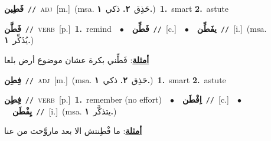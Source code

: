 \documentclass[10pt,a4paper,twoside]{article} %
\begin{document}
\begin{multicols}{2}
{\setlength\topsep{0pt}\textbf{\foreignlanguage{arabic}{فَطِين}}\ {\color{gray}\texttt{//}\color{black}}\ \textsc{adj}\ [m.]\ \color{gray}(msa. \foreignlanguage{arabic}{حَذِق}~\foreignlanguage{arabic}{\textbf{٢.}}  \foreignlanguage{arabic}{ذكي}~\foreignlanguage{arabic}{\textbf{١.}})\color{black}\ \textbf{1.}~smart  \textbf{2.}~astute\ } \vspace{2mm}

{\setlength\topsep{0pt}\textbf{\foreignlanguage{arabic}{فَطَّن}}\ {\color{gray}\texttt{//}\color{black}}\ \textsc{verb}\ [p.]\ \textbf{1.}~remind\ \ $\bullet$\ \ \setlength\topsep{0pt}\textbf{\foreignlanguage{arabic}{فَطِّن}}\ {\color{gray}\texttt{//}\color{black}}\ [c.]\ \ $\bullet$\ \ \setlength\topsep{0pt}\textbf{\foreignlanguage{arabic}{يفَطِّن}}\ {\color{gray}\texttt{//}\color{black}}\ [i.]\ \color{gray}(msa. \foreignlanguage{arabic}{يُذَكِّر}~\foreignlanguage{arabic}{\textbf{١.}})\color{black}\  \begin{flushright}\color{gray}\foreignlanguage{arabic}{\textbf{\underline{\foreignlanguage{arabic}{أمثلة}}}: فَطِّني بكرة عشان موضوع أرض بلعا}\end{flushright}\color{black}} \vspace{2mm}

{\setlength\topsep{0pt}\textbf{\foreignlanguage{arabic}{فِطِن}}\ {\color{gray}\texttt{//}\color{black}}\ \textsc{adj}\ [m.]\ \color{gray}(msa. \foreignlanguage{arabic}{حَذِق}~\foreignlanguage{arabic}{\textbf{٢.}}  \foreignlanguage{arabic}{ذكي}~\foreignlanguage{arabic}{\textbf{١.}})\color{black}\ \textbf{1.}~smart  \textbf{2.}~astute\ } \vspace{2mm}

{\setlength\topsep{0pt}\textbf{\foreignlanguage{arabic}{فِطِن}}\ {\color{gray}\texttt{//}\color{black}}\ \textsc{verb}\ [p.]\ \textbf{1.}~remember (no effort)\ \ $\bullet$\ \ \setlength\topsep{0pt}\textbf{\foreignlanguage{arabic}{اِفْطَن}}\ {\color{gray}\texttt{//}\color{black}}\ [c.]\ \ $\bullet$\ \ \setlength\topsep{0pt}\textbf{\foreignlanguage{arabic}{يِفْطَن}}\ {\color{gray}\texttt{//}\color{black}}\ [i.]\ \color{gray}(msa. \foreignlanguage{arabic}{يتذكَّر}~\foreignlanguage{arabic}{\textbf{١.}})\color{black}\  \begin{flushright}\color{gray}\foreignlanguage{arabic}{\textbf{\underline{\foreignlanguage{arabic}{أمثلة}}}: ما فْطِنتش الا بعد ماروَّحت من عنا}\end{flushright}\color{black}} \vspace{2mm}


\end{multicols}
\end{document}
